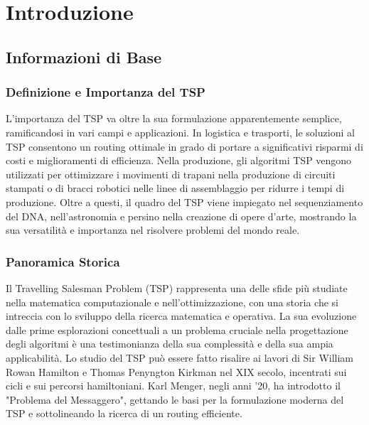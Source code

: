
%

\chapter{Introduzione}
\label{chapt:1}


\epigraphfontsize{\small\itshape}
\setlength\epigraphwidth{12.5cm}
\setlength\epigraphrule{0pt}

\section{Informazioni di Base}

\subsection{Definizione e Importanza del TSP}

L'importanza del \gls{TSP} va oltre la sua formulazione apparentemente semplice, ramificandosi in vari campi e applicazioni. In logistica e trasporti, le
soluzioni al \gls{TSP} consentono un routing ottimale in grado di portare a
significativi risparmi di costi e miglioramenti di efficienza. Nella
produzione, gli algoritmi \gls{TSP} vengono utilizzati per ottimizzare i
movimenti di trapani nella produzione di circuiti stampati o di bracci
robotici nelle linee di assemblaggio per ridurre i tempi di produzione.
Oltre a questi, il quadro del \gls{TSP} viene impiegato nel sequenziamento del
DNA, nell'astronomia e persino nella creazione di opere d'arte, mostrando
la sua versatilità e importanza nel risolvere problemi del mondo reale.

\subsection{Panoramica Storica}

Il Travelling Salesman Problem (\gls{TSP}) rappresenta una delle sfide più studiate nella matematica computazionale e nell'ottimizzazione, con una storia che si intreccia con lo sviluppo della ricerca matematica e operativa. La sua evoluzione dalle prime esplorazioni concettuali a un problema cruciale nella progettazione degli algoritmi è una testimonianza della sua complessità e della sua ampia applicabilità.
Lo studio del \gls{TSP} può essere fatto risalire ai lavori di Sir William Rowan Hamilton e Thomas Penyngton Kirkman nel XIX secolo, incentrati sui cicli e sui percorsi hamiltoniani. Karl Menger, negli anni '20, ha introdotto il "Problema del Messaggero", gettando le basi per la formulazione moderna del \gls{TSP} e sottolineando la ricerca di un routing efficiente.

